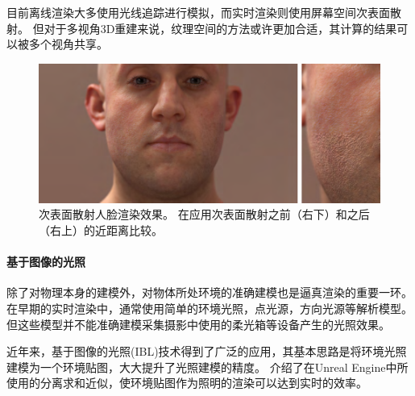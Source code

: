 目前离线渲染大多使用光线追踪进行模拟，而实时渲染则使用屏幕空间次表面散射。
但对于多视角3D重建来说，纹理空间的方法或许更加合适，其计算的结果可以被多个视角共享。

\begin{figure}
    \centering
    \includegraphics[width=\linewidth]{figures/sss}
    \caption[次表面散射人脸渲染效果]
    {次表面散射人脸渲染效果\citep{SpSSS}。
    在应用次表面散射之前（右下）和之后（右上）的近距离比较。}
\end{figure}

\paragraph{基于图像的光照}

除了对物理本身的建模外，对物体所处环境的准确建模也是逼真渲染的重要一环。
在早期的实时渲染中，通常使用简单的环境光照，点光源，方向光源等解析模型。
但这些模型并不能准确建模采集摄影中使用的柔光箱等设备产生的光照效果。

近年来，基于图像的光照(IBL)技术得到了广泛的应用，其基本思路是将环境光照建模为一个环境贴图，大大提升了光照建模的精度。
\citet{unreal_ssa}介绍了在Unreal Engine中所使用的分离求和近似，使环境贴图作为照明的渲染可以达到实时的效率。
